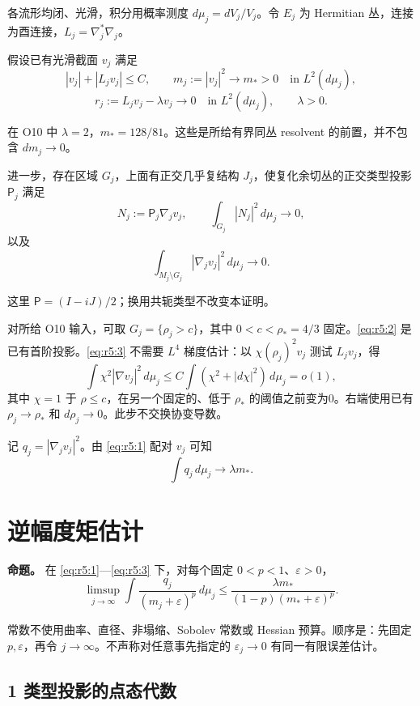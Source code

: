 \documentclass[UTF8,11pt,openany,oneside,fontset=none]{ctexbook}
\begin{document}
各流形均闭、光滑，积分用概率测度 \(d\mu_j=dV_j/V_j\)。令 \(E_j\) 为 Hermitian 丛，连接为酉连接，\(L_j=\nabla_j^*\nabla_j\)。

假设已有光滑截面 \(v_j\) 满足 \[
 |v_j|+|L_jv_j|\le C,\qquad
 m_j:=|v_j|^2\longrightarrow m_*>0\quad\text{in }L^2(d\mu_j),
\] \[
 r_j:=L_jv_j-\lambda v_j\longrightarrow0\quad\text{in }L^2(d\mu_j),\qquad \lambda>0.
\tag{5.1}\label{eq:r5:1}
\]

在 O10 中 \(\lambda=2\)，\(m_*=128/81\)。这些是所给有界同丛 resolvent 的前置，并不包含 \(dm_j\to0\)。

进一步，存在区域 \(G_j\)，上面有正交几乎复结构 \(J_j\)，使复化余切丛的正交类型投影 \(\mathsf P_j\) 满足 \[
 N_j:=\mathsf P_j\nabla_jv_j,\qquad
 \int_{G_j}|N_j|^2\,d\mu_j\longrightarrow0,
\tag{5.2}\label{eq:r5:2}
\] 以及 \[
 \int_{M_j\setminus G_j}|\nabla_jv_j|^2\,d\mu_j\longrightarrow0.
\tag{5.3}\label{eq:r5:3}
\]

这里 \(\mathsf P=(I-iJ)/2\)；换用共轭类型不改变本证明。

对所给 O10 输入，可取 \(G_j=\{\rho_j>c\}\)，其中 \(0<c<\rho_*=4/3\) 固定。\eqref{eq:r5:2} 是已有首阶投影。\eqref{eq:r5:3} 不需要 \(L^4\) 梯度估计：以 \(\chi(\rho_j)^2v_j\) 测试 \(L_jv_j\)，得 \[
 \int\chi^2|\nabla v_j|^2\,d\mu_j
 \le C\int(\chi^2+|d\chi|^2)\,d\mu_j=o(1),
\] 其中 \(\chi=1\) 于 \(\rho\le c\)，在另一个固定的、低于 \(\rho_*\) 的阈值之前变为0。右端使用已有 \(\rho_j\to\rho_*\) 和 \(d\rho_j\to0\)。此步不交换协变导数。

记 \(q_j=|\nabla_jv_j|^2\)。由 \eqref{eq:r5:1} 配对 \(v_j\) 可知 \[
 \int q_j\,d\mu_j\longrightarrow\lambda m_*.
\tag{5.4}\label{eq:r5:4}
\]

\section{逆幅度矩估计}\label{ch5:ux9006ux5e45ux5ea6ux77e9ux4f30ux8ba1}

\textbf{命题。} 在 \eqref{eq:r5:1}---\eqref{eq:r5:3} 下，对每个固定 \(0<p<1\)、\(\varepsilon>0\)， \[
 \boxed{
 \limsup_{j\to\infty}\int
 \frac{q_j}{(m_j+\varepsilon)^p}\,d\mu_j
 \le\frac{\lambda m_*}{(1-p)(m_*+\varepsilon)^p}.
 }
\tag{5.5}\label{eq:r5:5}
\]

常数不使用曲率、直径、非塌缩、Sobolev 常数或 Hessian 预算。顺序是：先固定 \(p,\varepsilon\)，再令 \(j\to\infty\)。不声称对任意事先指定的 \(\varepsilon_j\to0\) 有同一有限误差估计。

\subsection{1 类型投影的点态代数}\label{ch5:ux7c7bux578bux6295ux5f71ux7684ux70b9ux6001ux4ee3ux6570}
\end{document}
